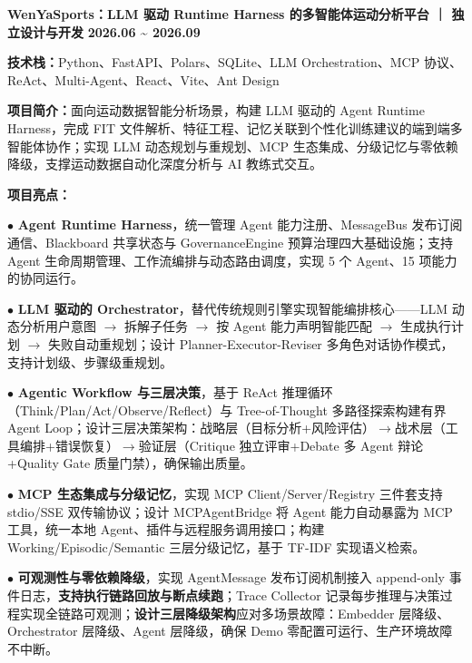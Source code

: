 \documentclass[11pt,a4paper,fontset=none]{ctexart}
\newcommand{\daterange}[1]{{\textbf{#1}}}
\newcommand{\entrytitle}[1]{{\textbf{#1}}}
\begin{document}
\noindent
\entrytitle{WenYaSports：LLM 驱动 Runtime Harness 的多智能体运动分析平台 ｜ 独立设计与开发}
\hfill \daterange{2026.06 \textasciitilde{} 2026.09}

\par\noindent
\textbf{技术栈：}Python、FastAPI、Polars、SQLite、LLM Orchestration、MCP 协议、ReAct、Multi-Agent、React、Vite、Ant Design

\par\noindent
\textbf{项目简介：}面向运动数据智能分析场景，构建 LLM 驱动的 Agent Runtime Harness，完成 FIT 文件解析、特征工程、记忆关联到个性化训练建议的端到端多智能体协作；实现 LLM 动态规划与重规划、MCP 生态集成、分级记忆与零依赖降级，支撑运动数据自动化深度分析与 AI 教练式交互。

\par\noindent
\textbf{项目亮点：}

\par\noindent
$\bullet$ \textbf{Agent Runtime Harness}，统一管理 Agent 能力注册、MessageBus 发布订阅通信、Blackboard 共享状态与 GovernanceEngine 预算治理四大基础设施；支持 Agent 生命周期管理、工作流编排与动态路由调度，实现 5 个 Agent、15 项能力的协同运行。

\par\noindent
$\bullet$ \textbf{LLM 驱动的 Orchestrator}，替代传统规则引擎实现智能编排核心——LLM 动态分析用户意图 $\rightarrow$ 拆解子任务 $\rightarrow$ 按 Agent 能力声明智能匹配 $\rightarrow$ 生成执行计划 $\rightarrow$ 失败自动重规划；设计 Planner-Executor-Reviser 多角色对话协作模式，支持计划级、步骤级重规划。

\par\noindent
$\bullet$ \textbf{Agentic Workflow 与三层决策}，基于 ReAct 推理循环（Think/Plan/Act/Observe/Reflect）与 Tree-of-Thought 多路径探索构建有界 Agent Loop；设计三层决策架构：战略层（目标分析+风险评估）$\rightarrow$战术层（工具编排+错误恢复）$\rightarrow$验证层（Critique 独立评审+Debate 多 Agent 辩论+Quality Gate 质量门禁），确保输出质量。

\par\noindent
$\bullet$ \textbf{MCP 生态集成与分级记忆}，实现 MCP Client/Server/Registry 三件套支持 stdio/SSE 双传输协议；设计 MCPAgentBridge 将 Agent 能力自动暴露为 MCP 工具，统一本地 Agent、插件与远程服务调用接口；构建 Working/Episodic/Semantic 三层分级记忆，基于 TF-IDF 实现语义检索。

\par\noindent
$\bullet$ \textbf{可观测性与零依赖降级}，实现 AgentMessage 发布订阅机制接入 append-only 事件日志，\textbf{支持执行链路回放与断点续跑}；Trace Collector 记录每步推理与决策过程实现全链路可观测；\textbf{设计三层降级架构}应对多场景故障：Embedder 层降级、Orchestrator 层降级、Agent 层降级，确保 Demo 零配置可运行、生产环境故障不中断。
\end{document}
